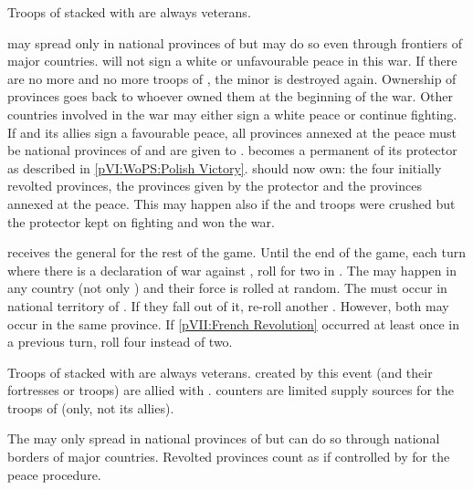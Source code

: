 \phmil
\aparag Troops of \payspologne stacked with \leaderKosciuszko are always
veterans.

\phpaix
\aparag \REVOLT may spread only in national provinces of \POL but may do so
even through frontiers of major countries.
\aparag \payspologne will not sign a white or unfavourable peace in this war.
\aparag If there are no more \REVOLT and no more troops of \payspologne, the
minor is destroyed again.
\bparag Ownership of provinces goes back to whoever owned them at the
beginning of the war.
\bparag Other countries involved in the war may either sign a white peace or
continue fighting.
\aparag If \payspologne and its allies sign a favourable peace, all provinces
annexed at the peace must be national provinces of \POL and are given to
\payspologne.
\bparag \payspologne becomes a permanent \EG of its protector as described in
\ref{pVI:WoPS:Polish Victory}.
\bparag \payspologne should now own: the four initially revolted provinces,
the provinces given by the protector and the provinces annexed at the peace.
\bparag This may happen also if the \REVOLT and troops were crushed but the
protector kept on fighting and won the war.



\phadm
\aparag \payspologne receives the general  for the
rest of the game.
\aparag Until the end of the game, each turn where there is a declaration of
war against \payspologne, roll for two \REVOLT in \POL.
\bparag The \REVOLT may happen in any country (not only \payspologne) and
their force is rolled at random.
\bparag The \REVOLT must occur in national territory of \POL. If they fall out
of it, re-roll another \REVOLT . However, both \REVOLT may occur in the same
province.
\bparag If \ref{pVII:French Revolution} occurred at least once in a previous
turn, roll four \REVOLT instead of two.

\phmil
\aparag Troops of \payspologne stacked with \leaderKosciuszko are always
veterans.
\aparag \REVOLT created by this event (and their fortresses or troops) are
allied with \payspologne.
\bparag \REVOLT counters are limited supply sources for the troops of
\payspologne (only, not its allies).

\phpaix
\aparag The \REVOLT may only spread in national provinces of \POL but can do
so through national borders of major countries.
\aparag Revolted provinces count as if controlled by \payspologne for the
peace procedure.



